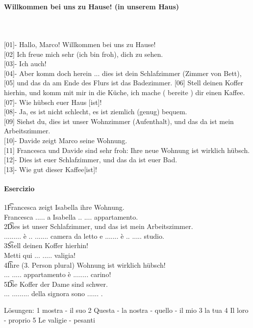 \documentclass{article}
\begin{document}
\paragraph{Willkommen bei uns zu Hause! (in unserem Haus)}\\
\\
{[01]}- Hallo, Marco! Willkommen bei uns zu Hause!\\
{[02]} Ich freue mich sehr (ich bin froh), dich zu sehen.\\
{[03]}- Ich auch!\\
{[04]}- Aber komm doch herein ... dies ist dein Schlafzimmer (Zimmer von
Bett),\\
{[05]} und das da am Ende des Flurs ist das Badezimmer.
{[06]} Stell deinen Koffer hierhin, und komm mit mir in die Küche, ich mache (
bereite ) dir einen Kaffee.\\
{[07]}- Wie hübsch euer Haus [ist]!\\
{[08]}- Ja, es ist nicht schlecht, es ist ziemlich (genug) bequem.\\
{[09]} Siehst du, dies ist unser Wohnzimmer (Aufenthalt), und das da ist mein
Arbeitszimmer.\\
{[10]}- Davide zeigt Marco seine Wohnung.\\
{[11]} Francesca und Davide sind sehr froh: Ihre neue Wohnung ist wirklich
hübsch.\\
{[12]}- Dies ist euer Schlafzimmer, und das da ist euer Bad.\\
{[13]}- Wie gut dieser Kaffee[ist]!


\paragraph{Esercizio}


1\t Francesca zeigt Isabella ihre Wohnung.\\
Francesca ..... a Isabella .. .... appartamento.\\
2\t Dies ist unser Schlafzimmer, und das ist mein Arbeitszimmer.\\
......... è .. ....... camera da letto e ....... è .. ..... studio.\\
3\t Stell deinen Koffer hierhin!\\
Metti qui ... ..... valigia!\\
4\t Ihre (3. Person plural) Wohnung ist wirklich hübsch!\\
... ..... appartamento è ........ carino!\\
5\t Die Koffer der Dame sind schwer.\\
... ......... della signora sono ...... .

Lösungen: 1 mostra - il suo 2 Questa - la nostra - quello - il mio 3 la tua
4 Il loro - proprio 5 Le valigie - pesanti
\end{document}
